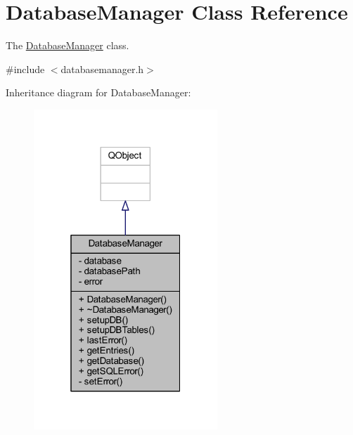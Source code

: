 \hypertarget{class_database_manager}{\section{Database\+Manager Class Reference}
\label{class_database_manager}
}


The \hyperlink{class_database_manager}{Database\+Manager} class.  




{\ttfamily \#include $<$databasemanager.\+h$>$}



Inheritance diagram for Database\+Manager\+:
\nopagebreak
\begin{figure}[H]
\begin{center}
\leavevmode
\includegraphics[width=196pt]{class_database_manager__inherit__graph}
\end{center}
\end{figure}


